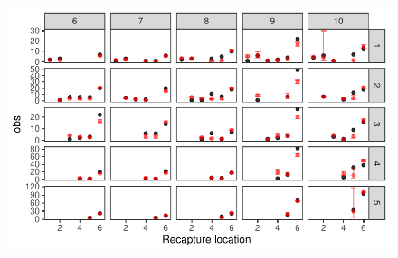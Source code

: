\documentclass[
  letterpaper,
  DIV=11,
  numbers=noendperiod]{scrartcl}
\begin{document}
\begin{figure}[H]

{\centering \includegraphics{KaleDoc_files/figure-pdf/unnamed-chunk-8-1.pdf}

}

\end{figure}
\end{document}
